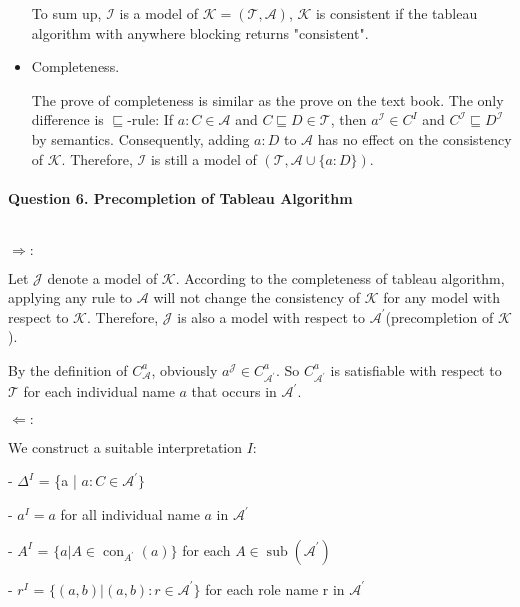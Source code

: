 \documentclass[12pt]{article}
\begin{document}
\begin{itemize}
        To sum up, $\mathcal{I}$ is a model of $\mathcal{K} = (\mathcal{T}, \mathcal{A})$, $\mathcal{K}$ is consistent if the tableau algorithm with anywhere blocking returns "consistent".
        \item Completeness. \par
        The prove of completeness is similar as the prove on the text book. The only difference is   $\sqsubseteq$-rule: If $a: C \in \mathcal{A}$ and $C \sqsubseteq D \in \mathcal{T}$, then $a^\mathcal{I} \in C^I$ and $C^\mathcal{I} \sqsubseteq D^\mathcal{I}$ by semantics. Consequently, adding $a: D$ to $\mathcal{A}$ has no effect on the consistency of $\mathcal{K}$. Therefore, $\mathcal{I}$ is still a model of $(\mathcal{T}, \mathcal{A} \cup\{a: D\})$.
    \end{itemize}

    \paragraph{Question 6. Precompletion of Tableau Algorithm}~{}
    \\

    $\Longrightarrow:$ \par
    Let $\mathcal{J}$ denote a model of $\mathcal{K}$. According to the completeness of tableau algorithm, applying any rule to $\mathcal{A}$ will not change the consistency of $\mathcal{K}$ for any model with respect to $\mathcal{K}$. Therefore, $\mathcal{J}$ is also a model with respect to $\mathcal{A}^{\prime}$(precompletion of $\mathcal{K}$). \par
    By the definition of $C_{\mathcal{A}}^a$, obviously $a^\mathcal{J} \in C_{\mathcal{A}^{\prime}}^a$. So $C_{\mathcal{A}^{'}}^a$ is satisfiable with respect to $\mathcal{T}$ for each individual name $a$ that occurs in $\mathcal{A}^{\prime}$. \par
    $\Longleftarrow:$ \par
    We construct a suitable interpretation $I$: 

    - $\Delta^I$ = \{a | $a:C \in \mathcal{A}^{\prime}\}$

    - $a^I=a$ for all individual name $a$ in $\mathcal{A}^{\prime}$

    - $A^I$ = $\{a | A\in \operatorname{con}_{A^{\prime}}(a)\}$ for each $A\in \operatorname{sub}(\mathcal{A}^{\prime})$

    - $r^I$ = $\{ (a, b) | (a, b) : r\in \mathcal{A}^{\prime}\}$ for each role name r in $\mathcal{A}^{'}$
\end{document}
